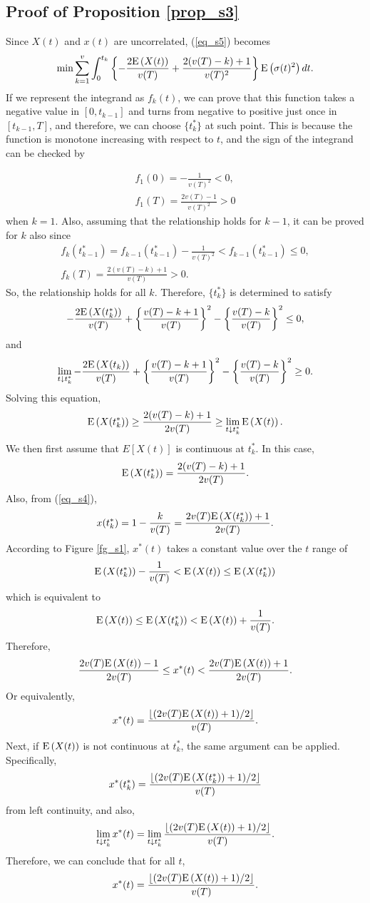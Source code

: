 \subsection{Proof of Proposition \ref{prop_s3}}
Since $X(t)$ and $x(t)$ are uncorrelated, (\ref{eq_s5}) becomes
\[
  \min \sum_{k=1}^v \int_0^{t_k} \left\{-\frac{2{\mathrm{E}}\left( X(t) \right)}{v(T)}+\frac{2(v(T)-k)+1}{v(T)^2} \right\}{\mathrm{E}}\left( \sigma(t)^2 \right)dt.
\]
If we represent the integrand as $f_k(t)$, we can prove that this function takes a negative value in $[0,t_{k-1}]$ and turns from negative to positive just once in $[t_{k-1},T]$, and therefore, we can choose $\{t_k^*\}$ at such point.  This is because the function is monotone increasing with respect to $t$, and the sign of the integrand can be checked by 

\[
  \begin{array}{ll}
    \displaystyle f_1(0)=-\frac{1}{v(T)^2}<0, \\
    \displaystyle f_1(T)=\frac{2v(T)-1}{v(T)^2}>0
  \end{array}
\]
when $k=1$.  Also, assuming that the relationship holds for $k-1$, it can be proved for $k$ also since
\[
  \begin{array}{ll}
    \displaystyle f_k(t_{k-1}^*)=f_{k-1}(t_{k-1}^*)-\frac{1}{v(T)^2}<f_{k-1}(t_{k-1}^*) \leq 0, \\
    \displaystyle f_k(T)=\frac{2(v(T)-k)+1}{v(T)}>0.
  \end{array}
\]
So, the relationship holds for all $k$. 
Therefore, $\{t_k^*\}$ is determined to satisfy
\[
  -\frac{2{\mathrm{E}}\left( X(t_k^*) \right)}{v(T)}+\left\{ \frac{v(T)-k+1}{v(T)} \right\}^2- \left\{ \frac{v(T)-k}{v(T)} \right\}^2 \leq 0,
\]
and
\[
  \lim_{t \downarrow t_k^*} -\frac{2{\mathrm{E}}\left( X(t_k) \right)}{v(T)}+\left\{ \frac{v(T)-k+1}{v(T)} \right\}^2-
\left\{ \frac{v(T)-k}{v(T)} \right\}^2 \geq 0.
\]
Solving this equation, 
\[
  {\mathrm{E}}\left( X(t_k^*) \right) \geq \frac{2(v(T)-k)+1}{2v(T)} \geq \lim_{t \downarrow t_k^*} {\mathrm{E}}\left( X(t) \right).
\]
We then first assume that $E[X(t)]$ is continuous at $t_k^*$.  In this case, 
\[
  {\mathrm{E}}\left( X(t_k^*) \right)=\frac{2(v(T)-k)+1}{2v(T)}.
\]
Also, from (\ref{eq_s4}),
\[
  x(t_k^*)=1-\frac{k}{v(T)}=\frac{2v(T){\mathrm{E}}\left( X(t_k^*) \right)+1}{2v(T)}.
\]
According to Figure \ref{fg_s1}, $x^*(t)$ takes a constant value over the $t$ range of 
\[
  {\mathrm{E}}\left( X(t_k^*) \right)-\frac{1}{v(T)}< {\mathrm{E}}\left( X(t) \right) \leq {\mathrm{E}}\left( X(t_k^*) \right)
\]
which is equivalent to
\[
  {\mathrm{E}}\left( X(t) \right) \leq {\mathrm{E}}\left( X(t_k^*) \right) < {\mathrm{E}}\left( X(t) \right)+\frac{1}{v(T)}.
\]
Therefore, 
\[
  \frac{2v(T){\mathrm{E}}\left( X(t) \right)-1}{2v(T)} \leq x^*(t) < \frac{2v(T){\mathrm{E}}\left( X(t) \right)+1}{2v(T)}.
\]
Or equivalently,
\[
  x^*(t)=\frac{\lfloor (2v(T){\mathrm{E}}\left( X(t) \right)+1)/2 \rfloor}{v(T)}.
\]
Next, if ${\mathrm{E}}\left( X(t) \right)$ is not continuous at $t_k^*$, the same argument can be applied.  Specifically, 
\[
  x^*(t_k^*)=\frac{\lfloor (2v(T){\mathrm{E}}\left( X(t_k^*) \right)+1)/2 \rfloor}{v(T)}
\]
from left continuity, and also,
\[
  \lim_{t \downarrow t_k^*}x^*(t)=\lim_{t \downarrow t_k^*}\frac{\lfloor (2v(T){\mathrm{E}}\left( X(t) \right)+1)/2 \rfloor}{v(T)}.
\]
Therefore, we can conclude that for all $t$,
\[
  x^*(t)=\frac{\lfloor (2v(T){\mathrm{E}}\left( X(t) \right)+1)/2 \rfloor}{v(T)}.
\]

